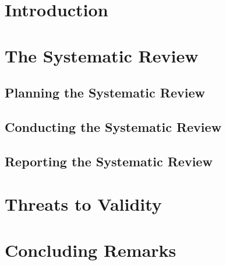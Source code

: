 \documentclass{sig-alternate}
\begin{document}
\linespread{0.95}



\linespread{0.9}
\section{Introduction}
	

%	
%		
	
\linespread{0.9}
\section{The Systematic Review}\label{method}
	
	\subsection{Planning the Systematic Review\label{planning}}
		
	\subsection{Conducting the Systematic Review\label{conducting}}
		
%			
	\subsection{Reporting the Systematic Review\label{reporting}}
		
\linespread{0.9}	
\section{Threats to Validity}\label{threats}
		
		
%	
\linespread{0.9}
\section{Concluding Remarks}\label{conclusion}
		

%	      
	
\linespread{0.9}
		

\end{document}
